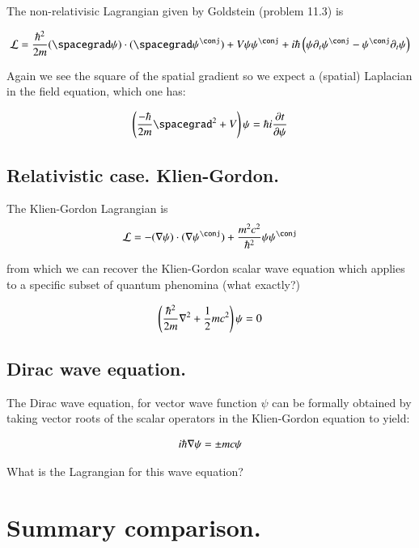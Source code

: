 \documentclass{article}
\begin{document}
The non-relativisic Lagrangian given by Goldstein (problem 11.3) is

\begin{align}
\LL = \frac{\hbar^2}{2m}
(\spacegrad \psi) \cdot (\spacegrad \psi^\conj) + V \psi \psi^\conj + {i \hbar} \left( \psi \partial_t \psi^\conj - \psi^\conj \partial_t \psi \right)
\end{align}

Again we see the square of the spatial gradient so we expect a (spatial) Laplacian
in the field equation, which one has:

\begin{align*}
\left( \frac{-\hbar}{2m} \spacegrad^2 + V \right) \psi = \hbar i \PD{t}{\psi}
\end{align*}

\subsection{ Relativistic case. Klien-Gordon. }

The Klien-Gordon Lagrangian is
\begin{align*}
\LL 
&= -(\grad \psi) \cdot (\grad \psi^\conj) + \frac{m^2 c^2}{\hbar^2} \psi \psi^\conj \\
\end{align*}

from which we can recover the Klien-Gordon scalar wave equation which applies to a
specific subset of quantum phenomina (what exactly?)

\begin{align*}
\left(\frac{\hbar^2}{2m} \nabla^2 + \frac{1}{2} m c^2\right) \psi = 0 \\
\end{align*}

\subsection{ Dirac wave equation. }

The Dirac wave equation, for vector wave function $\psi$ can be formally
obtained by
taking vector roots of the scalar operators in the Klien-Gordon equation
to yield:

\begin{align*}
i \hbar \nabla \psi = \pm m c \psi
\end{align*}

What is the Lagrangian for this wave equation?

\section{ Summary comparison. }
\end{document}
